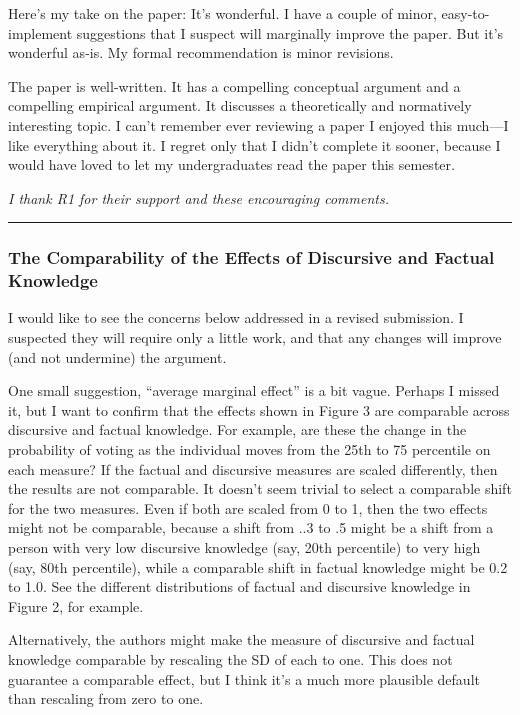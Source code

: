 Here’s my take on the paper: It’s wonderful. I have a couple of minor, easy-to-implement suggestions that I suspect will marginally improve the paper. But it’s wonderful as-is. My formal recommendation is minor revisions.

The paper is well-written. It has a compelling conceptual argument and a compelling empirical argument. It discusses a theoretically and normatively interesting topic. I can’t remember ever reviewing a paper I enjoyed this much—I like everything about it. I regret only that I didn’t complete it sooner, because I would have loved to let my undergraduates read the paper this semester.

\textit{I thank R1 for their support and these encouraging comments.}

\rule{\linewidth}{.01cm}

\subsubsection*{The Comparability of the Effects of Discursive and Factual Knowledge}

I would like to see the concerns below addressed in a revised submission. I suspected they will require only a little work, and that any changes will improve (and not undermine) the argument. 

One small suggestion, “average marginal effect” is a bit vague. Perhaps I missed it, but I want to confirm that the effects shown in Figure 3 are comparable across discursive and factual knowledge. For example, are these the change in the probability of voting as the individual moves from the 25th to 75 percentile on each measure? If the factual and discursive measures are scaled differently, then the results are not comparable. It doesn’t seem trivial to select a comparable shift for the two measures. Even if both are scaled from 0 to 1, then the two effects might not be comparable, because a shift from ..3 to .5 might be a shift from a person with very low discursive knowledge (say, 20th percentile) to very high (say, 80th percentile), while a comparable shift in factual knowledge might be 0.2 to 1.0. See the different distributions of factual and discursive knowledge in Figure 2, for example.

Alternatively, the authors might make the measure of discursive and factual knowledge comparable by rescaling the SD of each to one. This does not guarantee a comparable effect, but I think it’s a much more plausible default than rescaling from zero to one.

